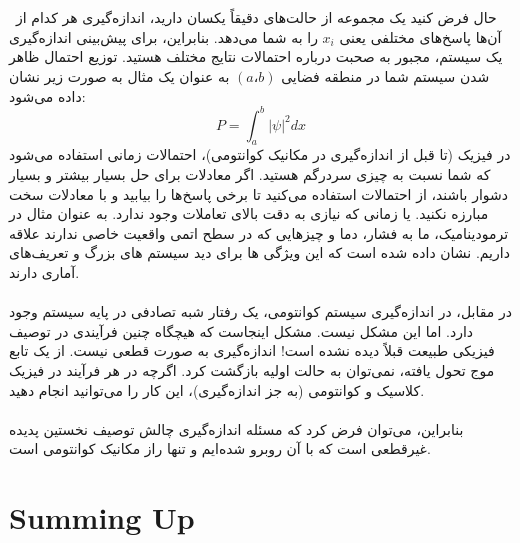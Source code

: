 \documentclass[10pt,a4paper]{article}
\begin{document}
            \\
            \\
\ حال فرض کنید یک مجموعه از حالت‌های دقیقاً یکسان دارید، اندازه‌گیری هر کدام از آن‌ها پاسخ‌های مختلفی یعنی $x_i$ را به شما می‌دهد. بنابراین، برای پیش‌بینی اندازه‌گیری یک سیستم، مجبور به صحبت درباره احتمالات نتایج مختلف هستید. توزیع احتمال ظاهر شدن سیستم شما در منطقه فضایی $(a، b)$ به عنوان یک مثال به صورت زیر نشان داده می‌شود:
            \begin{equation}
                P = \int_a^b |\psi|^2 dx 
            \end{equation}
در فیزیک (تا قبل از اندازه‌گیری در مکانیک کوانتومی)، احتمالات زمانی استفاده می‌شود که شما نسبت به چیزی سردرگم هستید. اگر معادلات برای حل بسیار بیشتر و بسیار دشوار باشند، از احتمالات استفاده می‌کنید تا برخی پاسخ‌ها را بیابید و با معادلات سخت مبارزه نکنید. یا زمانی که نیازی به دقت بالای تعاملات وجود ندارد. به عنوان مثال در ترمودینامیک، ما به فشار، دما و چیزهایی که در سطح اتمی واقعیت خاصی ندارند علاقه داریم. نشان داده شده است که این ویژگی ها برای دید سیستم های بزرگ و تعریف‌های آماری دارند.
            \\
            \\
در مقابل، در اندازه‌گیری سیستم کوانتومی، یک رفتار شبه تصادفی در پایه سیستم وجود دارد. اما این مشکل نیست. مشکل اینجاست که هیچگاه چنین فرآیندی در توصیف فیزیکی طبیعت قبلاً دیده نشده است! اندازه‌گیری به صورت قطعی نیست. از یک تابع موج تحول یافته، نمی‌توان به حالت اولیه بازگشت کرد. اگرچه در هر فرآیند در فیزیک کلاسیک و کوانتومی (به جز اندازه‌گیری)، این کار را می‌توانید انجام دهید.
            \\
            \\
            بنابراین، می‌توان فرض کرد که مسئله اندازه‌گیری چالش توصیف نخستین پدیده غیرقطعی است که با آن روبرو شده‌ایم و تنها راز مکانیک کوانتومی است.\cite{ep-qm}
    \section{Summing Up}
\end{document}
